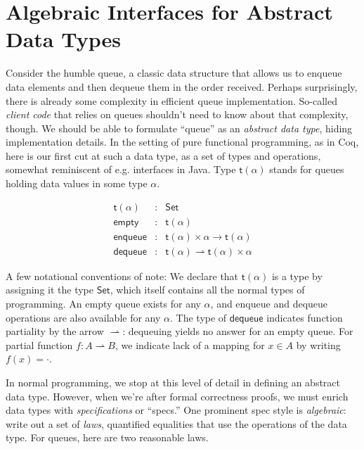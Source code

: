 \documentclass{amsbook}
\theoremstyle{definition}
\theoremstyle{remark}
\numberwithin{section}{chapter}
\numberwithin{equation}{chapter}
\begin{document}
\section{Algebraic Interfaces for Abstract Data Types}

\newcommand{\mt}[1]{\mathsf{#1}}

Consider the humble queue, a classic data structure that allows us to enqueue data elements and then dequeue them in the order received.
Perhaps surprisingly, there is already some complexity in efficient queue implementation.
So-called \emph{client code} that relies on queues shouldn't need to know about that complexity, though.
We should be able to formulate ``queue'' as an \emph{abstract data type}, hiding implementation details.
In the setting of pure functional programming, as in Coq, here is our first cut at such a data type, as a set of types and operations, somewhat reminiscent of e.g. interfaces in Java.
Type $\mt{t}(\alpha)$ stands for queues holding data values in some type $\alpha$.

\begin{eqnarray*}
  \mt{t}(\alpha) &:& \mt{Set} \\
  \mt{empty} &:& \mt{t}(\alpha) \\
  \mt{enqueue} &:& \mt{t}(\alpha) \times \alpha \to \mt{t}(\alpha) \\
  \mt{dequeue} &:& \mt{t}(\alpha) \rightharpoonup \mt{t}(\alpha) \times \alpha
\end{eqnarray*}

A few notational conventions of note:
We declare that $\mt{t}(\alpha)$ is a type by assigning it the type $\mt{Set}$, which itself contains all the normal types of programming.
An empty queue exists for any $\alpha$, and enqueue and dequeue operations are also available for any $\alpha$.
The type of $\mt{dequeue}$ indicates function partiality by the arrow $\rightharpoonup$: dequeuing yields no answer for an empty queue.
For partial function $f : A \rightharpoonup B$, we indicate lack of a mapping for $x \in A$ by writing $f(x) = \cdot$.

In normal programming, we stop at this level of detail in defining an abstract data type.
However, when we're after formal correctness proofs, we must enrich data types with \emph{specifications} or ``specs.''  
One prominent spec style is \emph{algebraic}: write out a set of \emph{laws}, quantified equalities that use the operations of the data type.
For queues, here are two reasonable laws.
\end{document}
